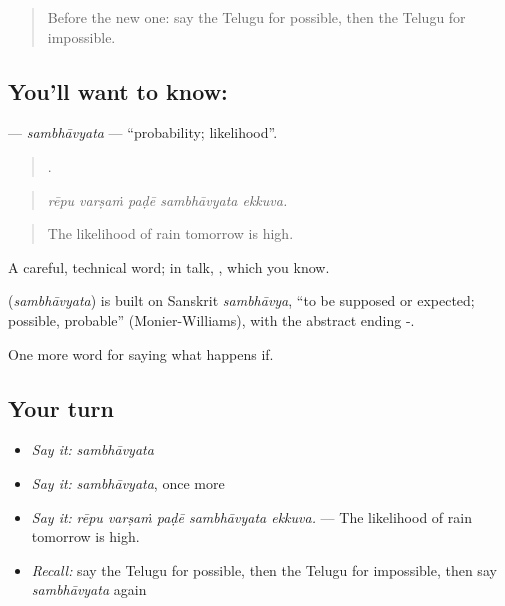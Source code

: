 \label{lesson:TE-C418-sambhavyata}



\begin{quote}
Before the new one: say the Telugu for possible, then the Telugu for impossible.
\end{quote}

\subsection*{You'll want to know: }
\textbf{} — \emph{sambhāvyata} — \textquotedblleft{}probability; likelihood\textquotedblright{}.

\begin{quote}
    .
\end{quote}

\begin{quote}
\emph{rēpu varṣaṁ paḍē sambhāvyata ekkuva.}
\end{quote}

\begin{quote}
The likelihood of rain tomorrow is high.
\end{quote}

A careful, technical word; in talk, , which you know.

\begin{cousinweb}
\textbf{} (\emph{sambhāvyata}) is built on Sanskrit \emph{sambhāvya}, \textquotedblleft{}to be supposed or expected; possible, probable\textquotedblright{} (Monier-Williams), with the abstract ending -.
\end{cousinweb}

\begin{grammarlens}[title={What you've built}]
One more word for saying what happens if.
\end{grammarlens}

\subsection*{Your turn}
\begin{itemize}
\raggedright
  \item \emph{Say it:} \emph{sambhāvyata}
  \item \emph{Say it:} \emph{sambhāvyata}, once more
  \item \emph{Say it:} \emph{rēpu varṣaṁ paḍē sambhāvyata ekkuva.} — The likelihood of rain tomorrow is high.
  \item \emph{Recall:} say the Telugu for possible, then the Telugu for impossible, then say \emph{sambhāvyata} again
\end{itemize}

